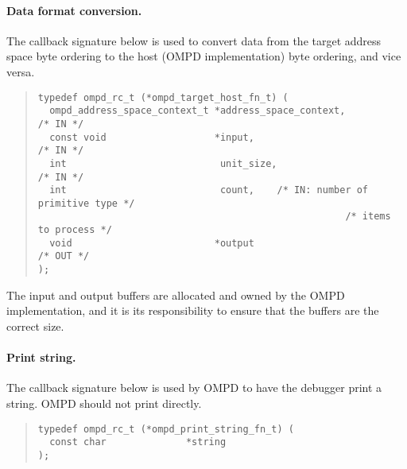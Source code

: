 \paragraph{Data format conversion.}
The callback signature below is used to convert data from the target 
address space byte ordering to the host (OMPD implementation) byte ordering,
and vice versa.

\begin{quote}
\begin{lstlisting}
typedef ompd_rc_t (*ompd_target_host_fn_t) (
  ompd_address_space_context_t *address_space_context,              /* IN */
  const void                   *input,                              /* IN */
  int                           unit_size,                          /* IN */
  int                           count,    /* IN: number of primitive type */
                                                      /* items to process */
  void                         *output                             /* OUT */
);
\end{lstlisting}
\end{quote}
The input and output buffers are allocated and owned by the
OMPD implementation, and it is its responsibility to ensure
that the buffers are the correct size.





\paragraph{Print string.}
The callback signature below is used by OMPD to have the debugger
print a string. OMPD should not print directly. 
\begin{quote}
\begin{lstlisting}
typedef ompd_rc_t (*ompd_print_string_fn_t) (
  const char              *string
);
\end{lstlisting}
\end{quote}
